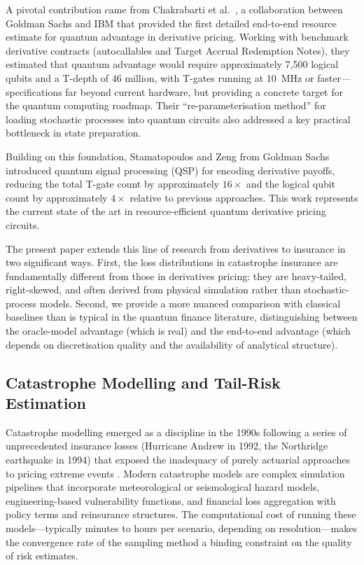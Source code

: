 \documentclass[11pt,a4paper]{article}
\begin{document}
A pivotal contribution came from Chakrabarti et al.\ \cite{Chakrabarti2021}, a collaboration between Goldman Sachs and IBM that provided the first detailed end-to-end resource estimate for quantum advantage in derivative pricing. Working with benchmark derivative contracts (autocallables and Target Accrual Redemption Notes), they estimated that quantum advantage would require approximately 7,500 logical qubits and a T-depth of 46 million, with T-gates running at 10~MHz or faster---specifications far beyond current hardware, but providing a concrete target for the quantum computing roadmap. Their ``re-parameterisation method'' for loading stochastic processes into quantum circuits also addressed a key practical bottleneck in state preparation.

Building on this foundation, Stamatopoulos and Zeng \cite{Stamatopoulos2024} from Goldman Sachs introduced quantum signal processing (QSP) for encoding derivative payoffs, reducing the total T-gate count by approximately $16\times$ and the logical qubit count by approximately $4\times$ relative to previous approaches. This work represents the current state of the art in resource-efficient quantum derivative pricing circuits.

The present paper extends this line of research from derivatives to insurance in two significant ways. First, the loss distributions in catastrophe insurance are fundamentally different from those in derivatives pricing: they are heavy-tailed, right-skewed, and often derived from physical simulation rather than stochastic-process models. Second, we provide a more nuanced comparison with classical baselines than is typical in the quantum finance literature, distinguishing between the oracle-model advantage (which is real) and the end-to-end advantage (which depends on discretisation quality and the availability of analytical structure).

\subsection{Catastrophe Modelling and Tail-Risk Estimation}

Catastrophe modelling emerged as a discipline in the 1990s following a series of unprecedented insurance losses (Hurricane Andrew in 1992, the Northridge earthquake in 1994) that exposed the inadequacy of purely actuarial approaches to pricing extreme events \cite{Grossi2005}. Modern catastrophe models are complex simulation pipelines that incorporate meteorological or seismological hazard models, engineering-based vulnerability functions, and financial loss aggregation with policy terms and reinsurance structures. The computational cost of running these models---typically minutes to hours per scenario, depending on resolution---makes the convergence rate of the sampling method a binding constraint on the quality of risk estimates.
\end{document}
